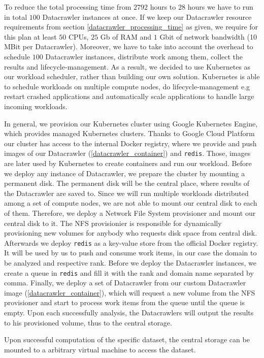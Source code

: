 To reduce the total processing time from $2792$ hours to $28$ hours we have to run in total $100$ Datacrawler instances at once. If we keep our Datacrawler resource requirements from section \ref{datacrawler_processing_time} as given, we require for this plan at least $50$ CPUs, $25$ Gb of RAM and $1$ Gbit of network bandwidth (10 MBit per Datacrawler). Moreover, we have to take into account the overhead to schedule $100$ Datacrawler instances, distribute work among them, collect the results and lifecycle-management. As a result, we decided to use Kubernetes as our workload scheduler, rather than building our own solution. Kubernetes is able to schedule workloads on multiple compute nodes, do lifecycle-management e.g restart crashed applications and automatically scale applications to handle large incoming workloads.

In general, we provision our Kubernetes cluster using Google Kubernetes Engine, which provides managed Kubernetes clusters. Thanks to Google Cloud Platform our cluster has access to the internal Docker registry, where we provide and push images of our Datacrawler (\ref{datacrawler_container}) and \texttt{redis}. Those, images are later used by Kubernetes to create containers and run our workload. Before we deploy any instance of Datacrawler, we prepare the cluster by mounting a permanent disk. The permanent disk will be the central place, where results of the Datacrawler are saved to. Since we will run multiple workloads distributed among a set of compute nodes, we are not able to mount our central disk to each of them. Therefore, we deploy a Network File System provisioner and mount our central disk to it. The NFS provisionier is responsible for dynamically provisioning new volumes for anybody who requests disk space from central disk. Afterwards we deploy \texttt{redis} as a key-value store from the official Docker registry. It will be used by us to push and consume work items, in our case the domain to be analyzed and respective rank. Before we deploy the Datacrawler instances, we create a queue in \texttt{redis} and fill it with the rank and domain name separated by comma. Finally, we deploy a set of Datacrawler from our custom Datacrawler image (\ref{datacrawler_container}), which will request a new volume from the NFS provisioner and start to process work items from the queue until the queue is empty. Upon each successfully analysis, the Datacrawlers will output the results to his provisioned volume, thus to the central storage.

Upon successful computation of the specific dataset, the central storage can be mounted to a arbitrary virtual machine to access the dataset. 


